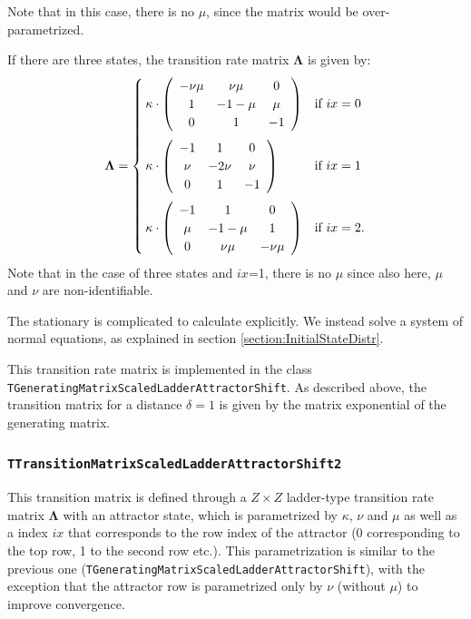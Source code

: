 \documentclass[a4paper,11pt]{article}
\def\bLambda{\boldsymbol{\Lambda}}
\newcommand{\class}[1]{\texttt{#1}}
\begin{document}
Note that in this case, there is no $\mu$, since the matrix would be over-parametrized.

If there are three states, the transition rate matrix $\bLambda$ is given by:
    \begin{equation*}
    \bLambda = \begin{cases}
    \kappa \cdot  \left(\begin{array}{ccc}
    -\nu\mu & \nu\mu & 0 \\
    1 & -1-\mu & \mu \\
    0 & 1 & -1
    \end{array}\right)  & \mbox{if } ix = 0 \vspace{0.2cm}\\
    \kappa \cdot  \left(\begin{array}{ccc}
    -1 & 1 & 0 \\
    \nu & -2\nu & \nu \\
    0 & 1 & -1
    \end{array}\right)  & \mbox{if } ix = 1 \vspace{0.2cm}\\
    \kappa \cdot  \left(\begin{array}{ccc}
    -1 & 1 & 0 \\
    \mu & -1-\mu & 1 \\
    0 & \nu\mu & -\nu\mu
    \end{array}\right) & \mbox{if } ix = 2.
    \end{cases}
    \end{equation*}
Note that in the case of three states and $ix$=1, there is no $\mu$ since also here, $\mu$ and $\nu$ are non-identifiable.

The stationary is complicated to calculate explicitly. We instead solve a system of normal equations, as explained in section \ref{section:InitialStateDistr}.


This transition rate matrix is implemented in the class \class{TGeneratingMatrixScaledLadderAttractorShift}. As described above, the transition matrix for a distance $\delta = 1$ is given by the matrix exponential of the generating matrix.

\subsubsection{\class{TTransitionMatrixScaledLadderAttractorShift2}}

This transition matrix is defined through a $Z\times Z$ ladder-type transition rate matrix $\bLambda$ with an attractor state, which is parametrized by $\kappa$, $\nu$ and $\mu$ as well as a index $ix$ that corresponds to the row index of the attractor (0 corresponding to the top row, 1 to the second row etc.). This parametrization is similar to the previous one (\class{TGeneratingMatrixScaledLadderAttractorShift}), with the exception that the attractor row is parametrized only by $\nu$ (without $\mu$) to improve convergence.
\end{document}
